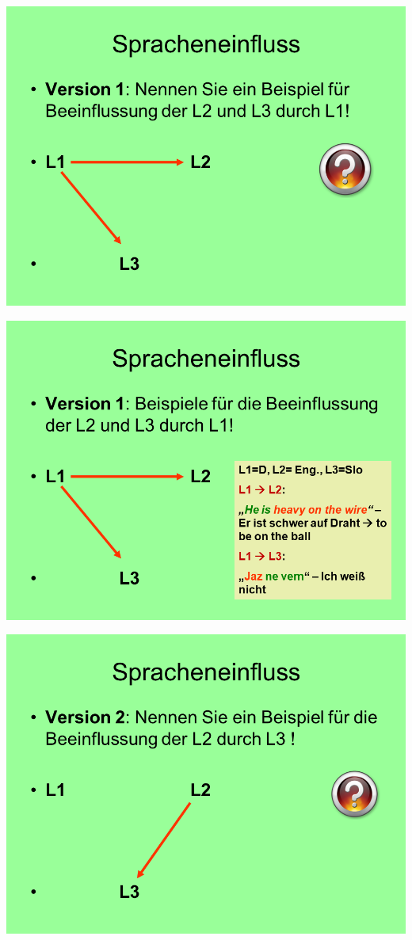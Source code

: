 \documentclass[
  letterpaper,
]{scrbook}
\begin{document}
\includegraphics[width=1\textwidth,height=\textheight]{./pictures/02_Spracheneinfluss_Sprachentrennung/Diapozitiv4.PNG}

\includegraphics[width=1\textwidth,height=\textheight]{./pictures/02_Spracheneinfluss_Sprachentrennung/Diapozitiv5.PNG}

\includegraphics[width=1\textwidth,height=\textheight]{./pictures/02_Spracheneinfluss_Sprachentrennung/Diapozitiv6.PNG}
\end{document}

